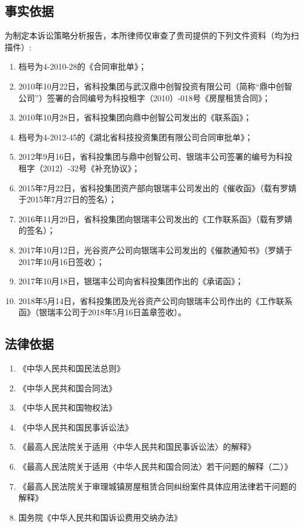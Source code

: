 \documentclass[fontset=none]{ctexart}
\begin{document}
	\subsection{事实依据} %
	\label{sub:事实依据}
	为制定本诉讼策略分析报告，本所律师仅审查了贵司提供的下列文件资料（均为扫描件）:
	\begin{enumerate}
	\item 档号为4-2010-28的《合同审批单》；
	\item 2010年10月22日，省科投集团与武汉鼎中创智投资有限公司（简称“鼎中创智公司”）签署的合同编号为科投租字（2010）-018号《房屋租赁合同》；

	\item 2010年10月28日，省科投集团向鼎中创智公司发出的《联系函》；

	\item 档号为4-2012-45的《湖北省科技投资集团有限公司合同审批单》；

	\item 2012年9月16日，省科投集团与鼎中创智公司、银瑞丰公司签署的编号为科投租字（2012）-32号《补充协议》；

	\item 2015年7月22日，省科投集团资产部向银瑞丰公司发出的《催收函》（载有罗婧于2015年7月27日的签名）；

	\item 2016年11月29日，省科投集团向银瑞丰公司发出的《工作联系函》（载有罗婧的签名）；

	\item 2017年10月12日，光谷资产公司向银瑞丰公司发出的《催款通知书》（罗婧于2017年10月16日签收）；

	\item 2017年10月18日，银瑞丰公司向省科投集团作出的《承诺函》；

	\item 2018年5月14日，省科投集团及光谷资产公司向银瑞丰公司作出的《工作联系函》（银瑞丰公司于2018年5月16日盖章签收）。
	\end{enumerate}

	\subsection{法律依据} %
	\label{sub:法律依据}
	
	\begin{enumerate}
		\item 《中华人民共和国民法总则》
		\item 《中华人民共和国合同法》
		\item 《中华人民共和国物权法》
		\item 《中华人民共和国民事诉讼法》
		\item 《最高人民法院关于适用〈中华人民共和国民事诉讼法〉的解释》
		\item 《最高人民法院关于适用〈中华人民共和国合同法〉若干问题的解释（二）》
		\item 《最高人民法院关于审理城镇房屋租赁合同纠纷案件具体应用法律若干问题的解释》
		\item 国务院《中华人民共和国诉讼费用交纳办法》
	\end{enumerate}
\end{document}
